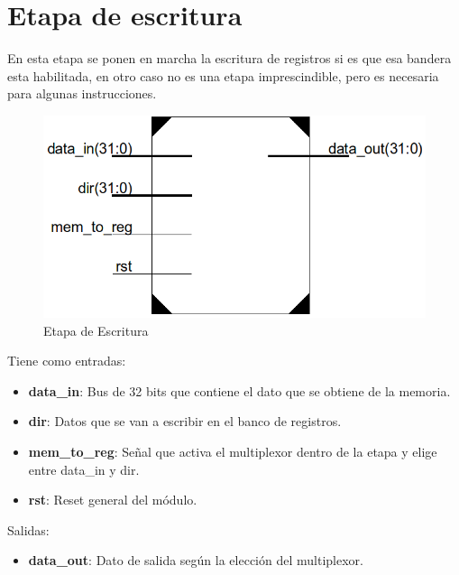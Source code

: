 \section {Etapa de escritura}

En esta etapa se ponen en marcha la escritura de registros si es que esa bandera esta habilitada, en otro caso no es una etapa imprescindible, pero es necesaria para algunas instrucciones.

\begin{figure}[H]
\centering
\includegraphics[scale=0.5]{img/wb_stage}
\caption{Etapa de Escritura}
\label{fig:wb_stage}
\end{figure}

Tiene como entradas:
\begin{itemize}
  \item \textbf{data\_in}: Bus de 32 bits que contiene el dato que se obtiene de la memoria.
  \item \textbf{dir}: Datos que se van a escribir en el banco de registros.
  \item \textbf{mem\_to\_reg}: Señal que activa el multiplexor dentro de la etapa y elige entre data\_in y dir.
  \item \textbf{rst}: Reset general del m\'odulo.
\end{itemize}

Salidas:
\begin{itemize}
  \item \textbf{data\_out}: Dato de salida seg\'un la elecci\'on del multiplexor.
\end{itemize}
